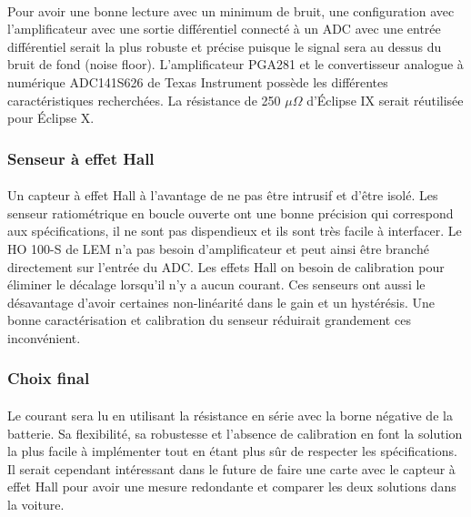 	\paragraph*{}
	Pour avoir une bonne lecture avec un minimum de bruit, une configuration avec l'amplificateur avec une sortie différentiel connecté à un ADC avec une entrée différentiel serait la plus robuste et précise puisque le signal sera au dessus du bruit de fond (noise floor). L'amplificateur PGA281 et le convertisseur analogue à numérique ADC141S626 de Texas Instrument possède les différentes caractéristiques recherchées. La résistance de 250 $\mu \Omega$ d'Éclipse IX serait réutilisée pour Éclipse X.
	
	\subsubsection*{Senseur à effet Hall}
	\paragraph*{}	
	Un capteur à effet Hall à l'avantage de ne pas être intrusif et d'être isolé. Les senseur ratiométrique en boucle ouverte ont une bonne précision qui correspond aux spécifications, il ne sont pas dispendieux et ils sont très facile à interfacer. Le HO 100-S de LEM n'a pas besoin d'amplificateur et peut ainsi être branché directement sur l'entrée du ADC. Les effets Hall on besoin de calibration pour éliminer le décalage lorsqu'il n'y a aucun courant. Ces senseurs ont aussi le désavantage d'avoir certaines non-linéarité dans le gain et un hystérésis. Une bonne caractérisation et calibration du senseur réduirait grandement ces inconvénient.
	
	\subsubsection*{Choix final}
	\paragraph*{}
	Le courant sera lu en utilisant la résistance en série avec la borne négative de la batterie. Sa flexibilité, sa robustesse et l'absence de calibration en font la solution la plus facile à implémenter tout en étant plus sûr de respecter les spécifications. Il serait cependant intéressant dans le future de faire une carte avec le capteur à effet Hall pour avoir une mesure redondante et comparer les deux solutions dans la voiture.	
		